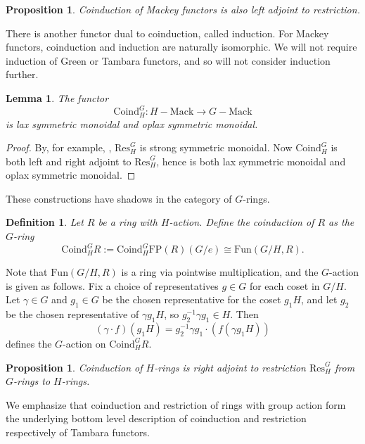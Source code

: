 \documentclass[11pt,dvipsnames]{amsart}
\newtheorem{lemma}[theorem]{Lemma}
\newtheorem{proposition}[theorem]{Proposition}
\theoremstyle{BoldRemark}
\newtheorem{definition}[theorem]{Definition}
\newcommand{\Mack}{\mathrm{Mack}}
\begin{document}
\begin{proposition}
	Coinduction of Mackey functors is also left adjoint to restriction.
\end{proposition}

There is another functor dual to coinduction, called induction. For Mackey functors, coinduction and induction are naturally isomorphic. We will not require induction of Green or Tambara functors, and so will not consider induction further.

\begin{lemma}\label{lem:coind-is-lax-monoidal}
	The functor 
    \[ 
        \mathrm{Coind}_H^G : H {-} \Mack \rightarrow G {-} \Mack 
    \] 
    is lax symmetric monoidal and oplax symmetric monoidal.
\end{lemma}

\begin{proof}
	By, for example, \cite[Lemma 6.6]{Cha24}, $\mathrm{Res}_H^G$ is strong symmetric monoidal. Now $\mathrm{Coind}_H^G$ is both left and right adjoint to $\mathrm{Res}_H^G$, hence is both lax symmetric monoidal and oplax symmetric monoidal.
\end{proof}

These constructions have shadows in the category of $G$-rings.

\begin{definition}
	Let $R$ be a ring with $H$-action. Define the coinduction of $R$ as the $G$-ring 
    \[ 
        \mathrm{Coind}_H^G R := \mathrm{Coind}_H^G \mathrm{FP}(R)(G/e) \cong \mathrm{Fun}(G/H,R) . 
    \]
\end{definition}

Note that $\mathrm{Fun}(G/H,R)$ is a ring via pointwise multiplication, and the $G$-action is given as follows. Fix a choice of representatives $g \in G$ for each coset in $G/H$. Let $\gamma \in G$ and $g_1 \in G$ be the chosen representative for the coset $g_1 H$, and let $g_2$ be the chosen representative of $\gamma g_1 H$, so $g_2^{-1} \gamma g_1 \in H$. Then \[ (\gamma \cdot f)(g_1 H) = g_2^{-1} \gamma g_1 \cdot (f(\gamma g_1 H)) \] defines the $G$-action on $\mathrm{Coind}_H^G R$.

\begin{proposition}
	Coinduction of $H$-rings is right adjoint to restriction $\mathrm{Res}_H^G$ from $G$-rings to $H$-rings.
\end{proposition}

We emphasize that coinduction and restriction of rings with group action form the underlying bottom level description of coinduction and restriction respectively of Tambara functors.
\end{document}
